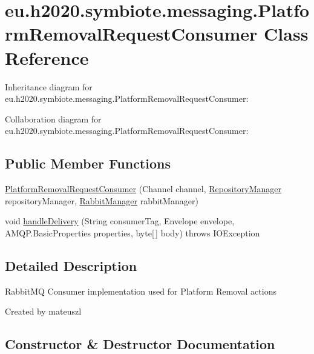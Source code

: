 \hypertarget{classeu_1_1h2020_1_1symbiote_1_1messaging_1_1PlatformRemovalRequestConsumer}{}\section{eu.\+h2020.\+symbiote.\+messaging.\+Platform\+Removal\+Request\+Consumer Class Reference}
\label{classeu_1_1h2020_1_1symbiote_1_1messaging_1_1PlatformRemovalRequestConsumer}


Inheritance diagram for eu.\+h2020.\+symbiote.\+messaging.\+Platform\+Removal\+Request\+Consumer\+:


Collaboration diagram for eu.\+h2020.\+symbiote.\+messaging.\+Platform\+Removal\+Request\+Consumer\+:
\subsection*{Public Member Functions}
\begin{DoxyCompactItemize}
\item 
\hyperlink{classeu_1_1h2020_1_1symbiote_1_1messaging_1_1PlatformRemovalRequestConsumer_a9a9727ae5b7a3ccbc533aecc82b81327}{Platform\+Removal\+Request\+Consumer} (Channel channel, \hyperlink{classeu_1_1h2020_1_1symbiote_1_1repository_1_1RepositoryManager}{Repository\+Manager} repository\+Manager, \hyperlink{classeu_1_1h2020_1_1symbiote_1_1messaging_1_1RabbitManager}{Rabbit\+Manager} rabbit\+Manager)
\item 
void \hyperlink{classeu_1_1h2020_1_1symbiote_1_1messaging_1_1PlatformRemovalRequestConsumer_a0ae1d5429dd625ccad89f8cbb219fbf8}{handle\+Delivery} (String consumer\+Tag, Envelope envelope, A\+M\+Q\+P.\+Basic\+Properties properties, byte\mbox{[}$\,$\mbox{]} body)  throws I\+O\+Exception 
\end{DoxyCompactItemize}


\subsection{Detailed Description}
Rabbit\+MQ Consumer implementation used for Platform Removal actions

Created by mateuszl 

\subsection{Constructor \& Destructor Documentation}
